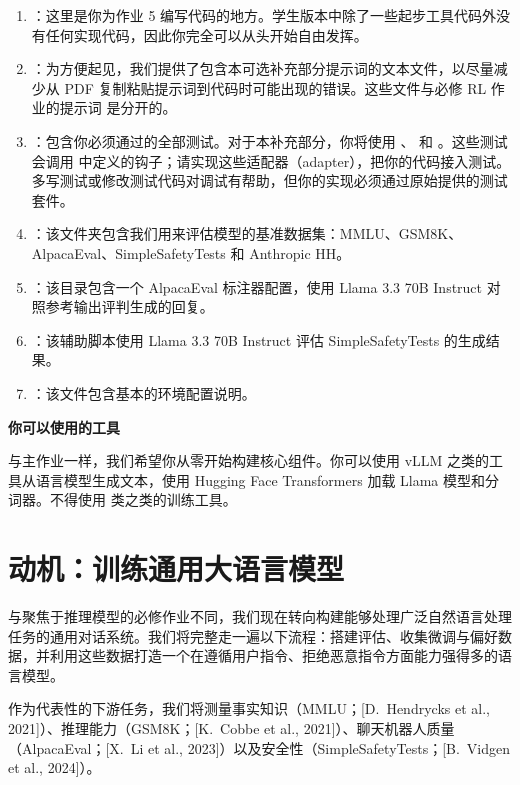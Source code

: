 \begin{enumerate}
  \item {}：这里是你为作业 5 编写代码的地方。学生版本中除了一些起步工具代码外没有任何实现代码，因此你完全可以从头开始自由发挥。
  \item {}：为方便起见，我们提供了包含本可选补充部分提示词的文本文件，以尽量减少从 PDF 复制粘贴提示词到代码时可能出现的错误。这些文件与必修 RL 作业的提示词  是分开的。
  \item {}：包含你必须通过的全部测试。对于本补充部分，你将使用 、 和 。这些测试会调用  中定义的钩子；请实现这些适配器（adapter），把你的代码接入测试。多写测试或修改测试代码对调试有帮助，但你的实现必须通过原始提供的测试套件。
  \item {}：该文件夹包含我们用来评估模型的基准数据集：MMLU、GSM8K、AlpacaEval、SimpleSafetyTests 和 Anthropic HH。
  \item {}：该目录包含一个 AlpacaEval 标注器配置，使用 Llama 3.3 70B Instruct 对照参考输出评判生成的回复。
  \item {}：该辅助脚本使用 Llama 3.3 70B Instruct 评估 SimpleSafetyTests 的生成结果。
  \item {}：该文件包含基本的环境配置说明。
\end{enumerate}

\textbf{你可以使用的工具}

与主作业一样，我们希望你从零开始构建核心组件。你可以使用 vLLM 之类的工具从语言模型生成文本，使用 Hugging Face Transformers 加载 Llama 模型和分词器。不得使用  类之类的训练工具。

\section{动机：训练通用大语言模型}

与聚焦于推理模型的必修作业不同，我们现在转向构建能够处理广泛自然语言处理任务的通用对话系统。我们将完整走一遍以下流程：搭建评估、收集微调与偏好数据，并利用这些数据打造一个在遵循用户指令、拒绝恶意指令方面能力强得多的语言模型。

作为代表性的下游任务，我们将测量事实知识（MMLU；[D.~Hendrycks et al., 2021]）、推理能力（GSM8K；[K.~Cobbe et al., 2021]）、聊天机器人质量（AlpacaEval；[X.~Li et al., 2023]）以及安全性（SimpleSafetyTests；[B.~Vidgen et al., 2024]）。

